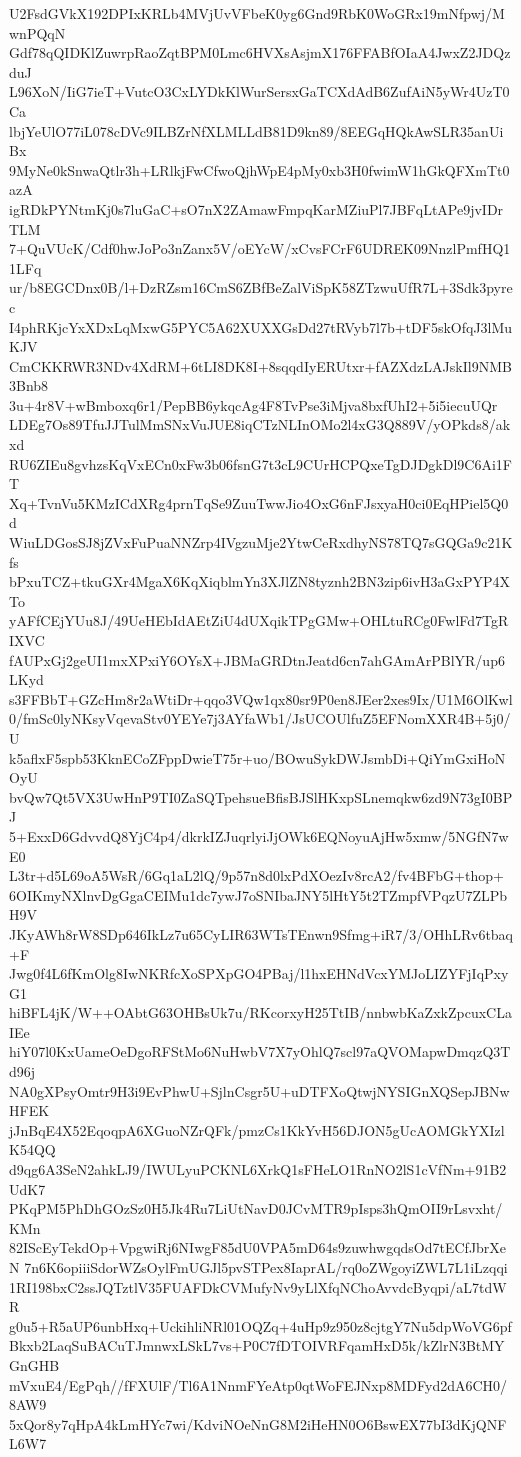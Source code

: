 U2FsdGVkX192DPIxKRLb4MVjUvVFbeK0yg6Gnd9RbK0WoGRx19mNfpwj/MwnPQqN
Gdf78qQIDKlZuwrpRaoZqtBPM0Lmc6HVXsAsjmX176FFABfOIaA4JwxZ2JDQzduJ
L96XoN/IiG7ieT+VutcO3CxLYDkKlWurSersxGaTCXdAdB6ZufAiN5yWr4UzT0Ca
lbjYeUlO77iL078cDVc9ILBZrNfXLMLLdB81D9kn89/8EEGqHQkAwSLR35anUiBx
9MyNe0kSnwaQtlr3h+LRlkjFwCfwoQjhWpE4pMy0xb3H0fwimW1hGkQFXmTt0azA
igRDkPYNtmKj0s7luGaC+sO7nX2ZAmawFmpqKarMZiuPl7JBFqLtAPe9jvIDrTLM
7+QuVUcK/Cdf0hwJoPo3nZanx5V/oEYcW/xCvsFCrF6UDREK09NnzlPmfHQ11LFq
ur/b8EGCDnx0B/l+DzRZsm16CmS6ZBfBeZalViSpK58ZTzwuUfR7L+3Sdk3pyrec
I4phRKjcYxXDxLqMxwG5PYC5A62XUXXGsDd27tRVyb7l7b+tDF5skOfqJ3lMuKJV
CmCKKRWR3NDv4XdRM+6tLI8DK8I+8sqqdIyERUtxr+fAZXdzLAJskIl9NMB3Bnb8
3u+4r8V+wBmboxq6r1/PepBB6ykqcAg4F8TvPse3iMjva8bxfUhI2+5i5iecuUQr
LDEg7Os89TfuJJTulMmSNxVuJUE8iqCTzNLInOMo2l4xG3Q889V/yOPkds8/akxd
RU6ZIEu8gvhzsKqVxECn0xFw3b06fsnG7t3cL9CUrHCPQxeTgDJDgkDl9C6Ai1FT
Xq+TvnVu5KMzICdXRg4prnTqSe9ZuuTwwJio4OxG6nFJsxyaH0ci0EqHPiel5Q0d
WiuLDGosSJ8jZVxFuPuaNNZrp4IVgzuMje2YtwCeRxdhyNS78TQ7sGQGa9c21Kfs
bPxuTCZ+tkuGXr4MgaX6KqXiqblmYn3XJlZN8tyznh2BN3zip6ivH3aGxPYP4XTo
yAFfCEjYUu8J/49UeHEbIdAEtZiU4dUXqikTPgGMw+OHLtuRCg0FwlFd7TgRIXVC
fAUPxGj2geUI1mxXPxiY6OYsX+JBMaGRDtnJeatd6cn7ahGAmArPBlYR/up6LKyd
s3FFBbT+GZcHm8r2aWtiDr+qqo3VQw1qx80sr9P0en8JEer2xes9Ix/U1M6OlKwl
0/fmSc0lyNKsyVqevaStv0YEYe7j3AYfaWb1/JsUCOUlfuZ5EFNomXXR4B+5j0/U
k5aflxF5spb53KknECoZFppDwieT75r+uo/BOwuSykDWJsmbDi+QiYmGxiHoNOyU
bvQw7Qt5VX3UwHnP9TI0ZaSQTpehsueBfisBJSlHKxpSLnemqkw6zd9N73gI0BPJ
5+ExxD6GdvvdQ8YjC4p4/dkrkIZJuqrlyiJjOWk6EQNoyuAjHw5xmw/5NGfN7wE0
L3tr+d5L69oA5WsR/6Gq1aL2lQ/9p57n8d0lxPdXOezIv8rcA2/fv4BFbG+thop+
6OIKmyNXlnvDgGgaCEIMu1dc7ywJ7oSNIbaJNY5lHtY5t2TZmpfVPqzU7ZLPbH9V
JKyAWh8rW8SDp646IkLz7u65CyLIR63WTsTEnwn9Sfmg+iR7/3/OHhLRv6tbaq+F
Jwg0f4L6fKmOlg8IwNKRfcXoSPXpGO4PBaj/l1hxEHNdVcxYMJoLIZYFjIqPxyG1
hiBFL4jK/W++OAbtG63OHBsUk7u/RKcorxyH25TtIB/nnbwbKaZxkZpcuxCLaIEe
hiY07l0KxUameOeDgoRFStMo6NuHwbV7X7yOhlQ7scl97aQVOMapwDmqzQ3Td96j
NA0gXPsyOmtr9H3i9EvPhwU+SjlnCsgr5U+uDTFXoQtwjNYSIGnXQSepJBNwHFEK
jJnBqE4X52EqoqpA6XGuoNZrQFk/pmzCs1KkYvH56DJON5gUcAOMGkYXIzlK54QQ
d9qg6A3SeN2ahkLJ9/IWULyuPCKNL6XrkQ1sFHeLO1RnNO2lS1cVfNm+91B2UdK7
PKqPM5PhDhGOzSz0H5Jk4Ru7LiUtNavD0JCvMTR9pIsps3hQmOII9rLsvxht/KMn
82IScEyTekdOp+VpgwiRj6NIwgF85dU0VPA5mD64s9zuwhwgqdsOd7tECfJbrXeN
7n6K6opiiiSdorWZsOylFmUGJl5pvSTPex8IaprAL/rq0oZWgoyiZWL7L1iLzqqi
1RI198bxC2ssJQTztlV35FUAFDkCVMufyNv9yLlXfqNChoAvvdcByqpi/aL7tdWR
g0u5+R5aUP6unbHxq+UckihliNRl01OQZq+4uHp9z950z8cjtgY7Nu5dpWoVG6pf
Bkxb2LaqSuBACuTJmnwxLSkL7vs+P0C7fDTOIVRFqamHxD5k/kZlrN3BtMYGnGHB
mVxuE4/EgPqh//fFXUlF/Tl6A1NnmFYeAtp0qtWoFEJNxp8MDFyd2dA6CH0/8AW9
5xQor8y7qHpA4kLmHYc7wi/KdviNOeNnG8M2iHeHN0O6BswEX77bI3dKjQNFL6W7
